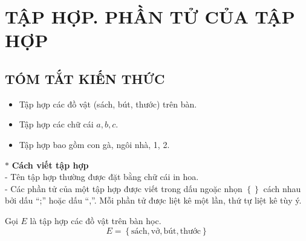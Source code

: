 \section{TẬP HỢP. PHẦN TỬ CỦA TẬP HỢP}
\subsection{TÓM TẮT KIẾN THỨC}
\begin{tomtat}
\begin{vd}
\begin{itemize}
	\item Tập hợp các đồ vật (sách, bút, thước) trên bàn.
	\item Tập hợp các chữ cái $a, b, c$. 
	\item Tập hợp bao gồm con gà, ngôi nhà, 1, 2.
\end{itemize}
\end{vd}
$*$ \textbf{Cách viết tập hợp}\\ 
- Tên tập hợp thường được đặt bằng chữ cái in hoa.\\ 
- Các phần tử của một tập hợp được viết trong dấu ngoặc nhọn $\left\{ {} \right\}$ cách nhau bởi dấu “;” hoặc dấu “,”. Mỗi phần tử được liệt kê một lần, thứ tự liệt  kê tùy ý.\vspace{0,3cm}\\
\begin{vd}
	Gọi $E$ là tập hợp các đồ vật trên bàn học.
\[E= \left\{ \text{sách}, \text{vở}, \text{bút}, \text{thước} \right\}\]


\end{vd}
\end{tomtat}
